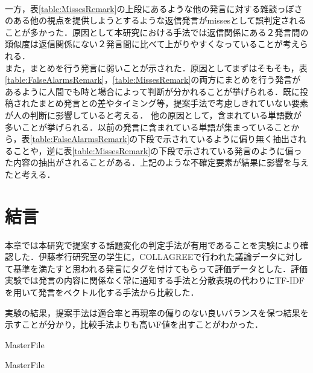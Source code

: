\\
一方，表\ref{table:MissesRemark}の上段にあるような他の発言に対する雑談っぽさのある他の視点を提供しようとするような返信発言がmissesとして誤判定されることが多かった．原因として本研究における手法では返信関係にある２発言間の類似度は返信関係にない２発言間に比べて上がりやすくなっていることが考えられる．
\\
また，まとめを行う発言に弱いことが示された．原因としてまずはそもそも，表\ref{table:FalseAlarmsRemark}，\ref{table:MissesRemark}の両方にまとめを行う発言があるように人間でも時と場合によって判断が分かれることが挙げられる．既に投稿されたまとめ発言との差やタイミング等，提案手法で考慮しきれていない要素が人の判断に影響していると考える．
他の原因として，含まれている単語数が多いことが挙げられる．以前の発言に含まれている単語が集まっていることから，表\ref{table:FalseAlarmsRemark}の下段で示されているように偏り無く抽出されることや，逆に表\ref{table:MissesRemark}の下段で示されている発言のように偏った内容の抽出がされることがある．上記のような不確定要素が結果に影響を与えたと考える．

\section{結言}
\label{exp:conclusion}
本章では本研究で提案する話題変化の判定手法が有用であることを実験により確認した．伊藤孝行研究室の学生に，COLLAGREEで行われた議論データに対して基準を満たすと思われる発言にタグを付けてもらって評価データとした．評価実験では発言の内容に関係なく常に通知する手法と分散表現の代わりにTF-IDFを用いて発言をベクトル化する手法から比較した．

実験の結果，提案手法は適合率と再現率の偏りのない良いバランスを保つ結果を示すことが分かり，比較手法よりも高いF値を出すことがわかった．

 \expandafter\ifx\csname MasterFile\endcsname\relax
	\def\BibFile{hoge}
	
  \fi
  \expandafter\ifx\csname MasterFile\endcsname\relax

\fi
